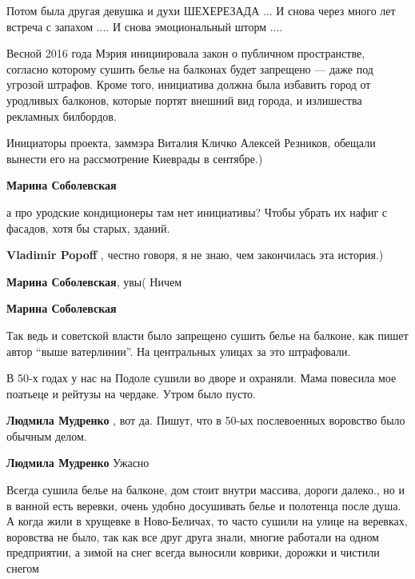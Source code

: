 \begin{itemize}
\begin{itemize}
\begin{itemize}
Потом была другая девушка и духи ШЕХЕРЕЗАДА ... И снова через много лет встреча
с запахом .... И снова эмоциональный шторм ....
\end{itemize} %

\end{itemize} %


Весной 2016 года Мэрия инициировала закон о публичном пространстве, согласно
которому сушить белье на балконах будет запрещено — даже под угрозой штрафов.
Кроме того, инициатива должна была избавить город от уродливых балконов,
которые портят внешний вид города, и излишества рекламных билбордов.

Инициаторы проекта, заммэра Виталия Кличко Алексей Резников, обещали вынести
его на рассмотрение Киеврады в сентябре.)

\begin{itemize} %
\textbf{Марина Соболевская} 

а про уродские кондиционеры там нет инициативы? Чтобы убрать их нафиг с
фасадов, хотя бы старых, зданий.


\textbf{Vladimir Popoff} , честно говоря, я не знаю, чем закончилась эта история.)

\textbf{Марина Соболевская}, увы( Ничем

\textbf{Марина Соболевская} 

Так ведь и советской власти было запрещено сушить белье на балконе, как пишет
автор \enquote{выше ватерлинии}. На центральных улицах за это штрафовали.

\end{itemize} %

В 50-х годах у нас на Подоле сушили во дворе и охраняли.
Мама повесила мое поатьеце и рейтузы на чердаке. Утром было пусто.

\begin{itemize} %
\textbf{Людмила Мудренко} , вот да. Пишут, что в 50-ых послевоенных воровство было обычным делом.

\textbf{Людмила Мудренко} Ужасно
\end{itemize} %


Всегда сушила белье на балконе, дом стоит внутри массива, дороги далеко., но и
в ванной есть веревки, очень удобно досушивать белье и полотенца после душа. А
когда жили в хрущевке в Ново-Беличах, то часто сушили на улице на веревках,
воровства не было, так как все друг друга знали, многие работали на одном
предприятии, а зимой на снег всегда выносили коврики, дорожки и чистили снегом


\end{itemize}

